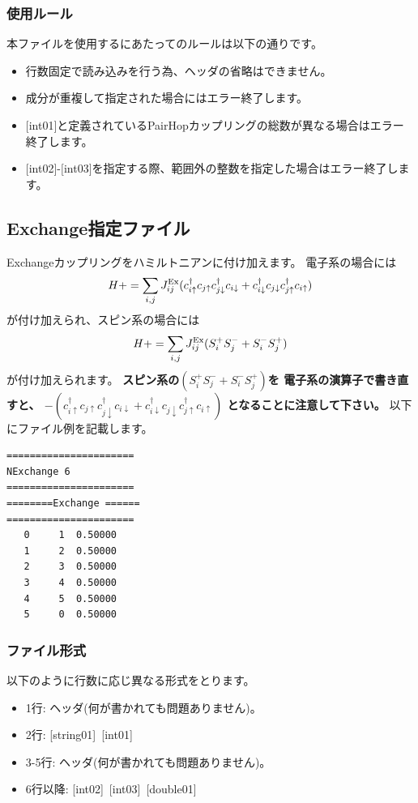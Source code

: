 \subsubsection{使用ルール}
本ファイルを使用するにあたってのルールは以下の通りです。
\begin{itemize}
\item 行数固定で読み込みを行う為、ヘッダの省略はできません。
\item 成分が重複して指定された場合にはエラー終了します。
\item $[$int01$]$と定義されているPairHopカップリングの総数が異なる場合はエラー終了します。
\item $[$int02$]$-$[$int03$]$を指定する際、範囲外の整数を指定した場合はエラー終了します。
\end{itemize}

\newpage
\subsection{Exchange指定ファイル}
Exchangeカップリングをハミルトニアンに付け加えます。
電子系の場合には
\begin{equation}
H+=\sum_{i,j}J_{ij}^{\rm Ex} (c_ {i \uparrow}^{\dag}c_{j\uparrow}c_{j \downarrow}^{\dag}c_{i  \downarrow}+c_ {i \downarrow}^{\dag}c_{j\downarrow}c_{j \uparrow}^{\dag}c_{i  \uparrow})
\end{equation}
が付け加えられ、スピン系の場合には
\begin{equation}
H+=\sum_{i,j}J_{ij}^{\rm Ex} (S_i^+S_j^-+S_i^-S_j^+)
\end{equation}
が付け加えられます。
{\bf スピン系の$(S_i^+S_j^-+S_i^-S_j^+)$を
電子系の演算子で書き直すと、
$-(c_ {i \uparrow}^{\dag}c_{j\uparrow}c_{j \downarrow}^{\dag}c_{i  \downarrow}+c_ {i \downarrow}^{\dag}c_{j\downarrow}c_{j \uparrow}^{\dag}c_{i  \uparrow})$
となることに注意して下さい。}
以下にファイル例を記載します。

\begin{minipage}{12.5cm}
\begin{screen}
\begin{verbatim}
====================== 
NExchange 6  
====================== 
========Exchange ====== 
====================== 
   0     1  0.50000
   1     2  0.50000
   2     3  0.50000
   3     4  0.50000
   4     5  0.50000
   5     0  0.50000
\end{verbatim}
\end{screen}
\end{minipage}

\subsubsection{ファイル形式}
以下のように行数に応じ異なる形式をとります。
 \begin{itemize}
   \item  1行:  ヘッダ(何が書かれても問題ありません)。
   \item  2行:   [string01]~[int01]
   \item  3-5行:  ヘッダ(何が書かれても問題ありません)。
   \item  6行以降:
   [int02]~[int03]~[double01] 
  \end{itemize}
